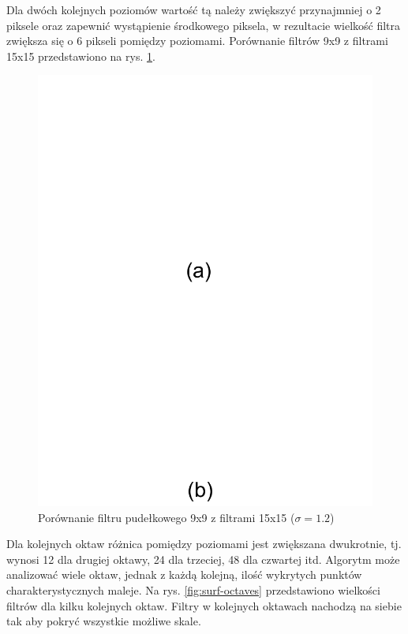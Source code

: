 Dla dwóch kolejnych poziomów wartość tą należy zwiększyć przynajmniej o 2 piksele oraz zapewnić wystąpienie środkowego piksela, w rezultacie wielkość filtra zwiększa się o 6 pikseli pomiędzy poziomami. Porównanie filtrów 9x9 z filtrami 15x15 przedstawiono na rys. \ref{fig:surf-9to15}.

\begin{figure}[h]
	\centering
	\includegraphics[scale=0.7]{graphics/01_podstawy_teoretyczne/surf-9to15.pdf}
	\caption{Porównanie filtru pudełkowego 9x9 z filtrami 15x15 ($\sigma = 1.2$) \cite{BAY08}}
	\label{fig:surf-9to15}
\end{figure}

Dla kolejnych oktaw różnica pomiędzy poziomami jest zwiększana dwukrotnie, tj. wynosi 12 dla drugiej oktawy, 24 dla trzeciej, 48 dla czwartej itd. Algorytm może analizować wiele oktaw, jednak z każdą kolejną, ilość wykrytych punktów charakterystycznych maleje. Na rys. \ref{fig:surf-octaves} przedstawiono wielkości filtrów dla kilku kolejnych oktaw. Filtry w kolejnych oktawach nachodzą na siebie tak aby pokryć wszystkie możliwe skale.

